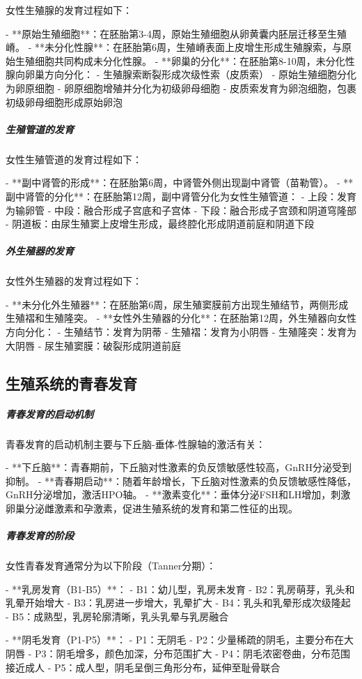 \begin{enumerate}
女性生殖腺的发育过程如下：

- **原始生殖细胞**：在胚胎第3-4周，原始生殖细胞从卵黄囊内胚层迁移至生殖嵴。
- **未分化性腺**：在胚胎第6周，生殖嵴表面上皮增生形成生殖腺索，与原始生殖细胞共同构成未分化性腺。
- **卵巢的分化**：在胚胎第8-10周，未分化性腺向卵巢方向分化：
  - 生殖腺索断裂形成次级性索（皮质索）
  - 原始生殖细胞分化为卵原细胞
  - 卵原细胞增殖并分化为初级卵母细胞
  - 皮质索发育为卵泡细胞，包裹初级卵母细胞形成原始卵泡

\subparagraph{生殖管道的发育}

女性生殖管道的发育过程如下：

- **副中肾管的形成**：在胚胎第6周，中肾管外侧出现副中肾管（苗勒管）。
- **副中肾管的分化**：在胚胎第12周，副中肾管分化为女性生殖管道：
  - 上段：发育为输卵管
  - 中段：融合形成子宫底和子宫体
  - 下段：融合形成子宫颈和阴道穹隆部
  - 阴道板：由尿生殖窦上皮增生形成，最终腔化形成阴道前庭和阴道下段

\subparagraph{外生殖器的发育}

女性外生殖器的发育过程如下：

- **未分化外生殖器**：在胚胎第6周，尿生殖窦膜前方出现生殖结节，两侧形成生殖褶和生殖隆突。
- **女性外生殖器的分化**：在胚胎第12周，外生殖器向女性方向分化：
  - 生殖结节：发育为阴蒂
  - 生殖褶：发育为小阴唇
  - 生殖隆突：发育为大阴唇
  - 尿生殖窦膜：破裂形成阴道前庭

\subsection{生殖系统的青春发育}

\subparagraph{青春发育的启动机制}

青春发育的启动机制主要与下丘脑-垂体-性腺轴的激活有关：

- **下丘脑**：青春期前，下丘脑对性激素的负反馈敏感性较高，GnRH分泌受到抑制。
- **青春期启动**：随着年龄增长，下丘脑对性激素的负反馈敏感性降低，GnRH分泌增加，激活HPO轴。
- **激素变化**：垂体分泌FSH和LH增加，刺激卵巢分泌雌激素和孕激素，促进生殖系统的发育和第二性征的出现。

\subparagraph{青春发育的阶段}

女性青春发育通常分为以下阶段（Tanner分期）：

- **乳房发育（B1-B5）**：
  - B1：幼儿型，乳房未发育
  - B2：乳房萌芽，乳头和乳晕开始增大
  - B3：乳房进一步增大，乳晕扩大
  - B4：乳头和乳晕形成次级隆起
  - B5：成熟型，乳房轮廓清晰，乳头乳晕与乳房融合

- **阴毛发育（P1-P5）**：
  - P1：无阴毛
  - P2：少量稀疏的阴毛，主要分布在大阴唇
  - P3：阴毛增多，颜色加深，分布范围扩大
  - P4：阴毛浓密卷曲，分布范围接近成人
  - P5：成人型，阴毛呈倒三角形分布，延伸至耻骨联合


\end{enumerate}
